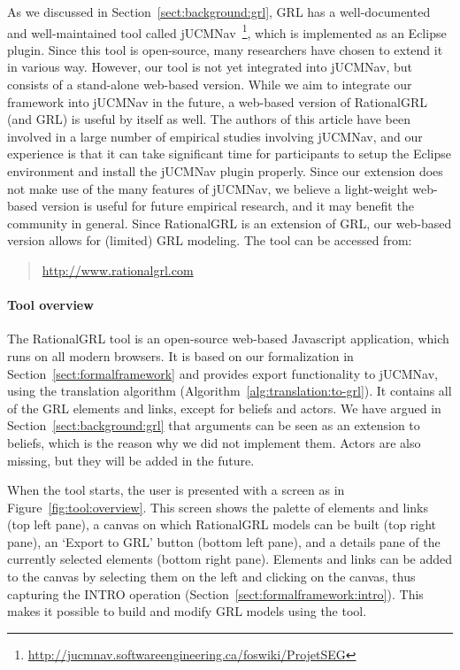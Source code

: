 As we discussed in Section~\ref{sect:background:grl}, GRL has a well-documented and well-maintained tool called jUCMNav~\cite{jUCMNav}\footnote{\url{http://jucmnav.softwareengineering.ca/foswiki/ProjetSEG}}, which is implemented as an Eclipse plugin. Since this tool is open-source, many researchers have chosen to extend it in various way. However, our tool is not yet integrated into jUCMNav, but consists of a stand-alone web-based version. While we aim to integrate our framework into jUCMNav in the future, a web-based version of RationalGRL (and GRL) is useful by itself as well. The authors of this article have been involved in a large number of empirical studies involving jUCMNav, and our experience is that it can take significant time for participants to setup the Eclipse environment and install the jUCMNav plugin properly. Since our extension does not make use of the many features of jUCMNav, we believe a light-weight web-based version is useful for future empirical research, and it may benefit the community in general. Since RationalGRL is an extension of GRL, our web-based version allows for (limited) GRL modeling. The tool can be accessed from:

\begin{quote}
\url{http://www.rationalgrl.com}
\end{quote}

\paragraph{Tool overview} The RationalGRL tool is an open-source web-based Javascript application, which runs on all modern browsers. It is based on our formalization in Section~\ref{sect:formalframework} and provides export functionality to jUCMNav, using the translation algorithm (Algorithm~\ref{alg:translation:to-grl}). It contains all of the GRL elements and links, except for beliefs and actors. We have argued in Section~\ref{sect:background:grl} that arguments can be seen as an extension to beliefs, which is the reason why we did not implement them. Actors are also missing, but they will be added in the future.

When the tool starts, the user is presented with a screen as in Figure~\ref{fig:tool:overview}. This screen shows the palette of elements and links (top left pane), a canvas on which RationalGRL models can be built (top right pane), an `Export to GRL' button (bottom left pane), and a details pane of the currently selected elements (bottom right pane). Elements and links can be added to the canvas by selecting them on the left and clicking on the canvas, thus capturing the \textsf{INTRO} operation (Section~\ref{sect:formalframework:intro}). This makes it possible to build and modify GRL models using the tool. 

